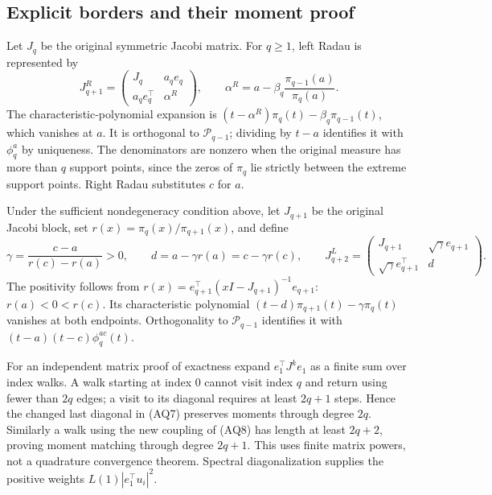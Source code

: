 \documentclass[11pt,a4paper]{article}
\theoremstyle{definition}
\begin{document}
\subsection*{Explicit borders and their moment proof}
Let $J_q$ be the original symmetric Jacobi matrix.
For $q\ge1$, left Radau is represented by
\begin{equation}
 J^R_{q+1}=\begin{pmatrix}J_q&a_qe_q\\a_qe_q^\top&\alpha^R\end{pmatrix},
 \qquad
 \alpha^R=a-\beta_q\frac{\pi_{q-1}(a)}{\pi_q(a)}.
 \tag{AQ7}
\end{equation}
The characteristic-polynomial expansion is
$(t-\alpha^R)\pi_q(t)-\beta_q\pi_{q-1}(t)$, which vanishes at $a$.
It is orthogonal to $\mathcal P_{q-1}$; dividing by $t-a$ identifies
it with $\phi_q^a$ by uniqueness.  The denominators are nonzero when
the original measure has more than $q$ support points, since the
zeros of $\pi_q$ lie strictly between the extreme support points.
Right Radau substitutes $c$ for $a$.

Under the sufficient nondegeneracy condition above, let $J_{q+1}$
be the original Jacobi block, set
$r(x)=\pi_q(x)/\pi_{q+1}(x)$, and define
\begin{equation}
 \gamma=\frac{c-a}{r(c)-r(a)}>0,
 \qquad d=a-\gamma r(a)=c-\gamma r(c),
 \qquad
 J^L_{q+2}=\begin{pmatrix}J_{q+1}&\sqrt\gamma e_{q+1}\\
                  \sqrt\gamma e_{q+1}^{\top}&d\end{pmatrix}.
 \tag{AQ8}
\end{equation}
The positivity follows from
$r(x)=e_{q+1}^{\top}(xI-J_{q+1})^{-1}e_{q+1}$:
$r(a)<0<r(c)$.  Its characteristic polynomial
$(t-d)\pi_{q+1}(t)-\gamma\pi_q(t)$ vanishes at both endpoints.
Orthogonality to $\mathcal P_{q-1}$ identifies it with
$(t-a)(t-c)\phi_q^{ac}(t)$.

For an independent matrix proof of exactness expand
$e_1^\top J^ke_1$ as a finite sum over index walks.
A walk starting at index $0$ cannot visit index $q$ and return
using fewer than $2q$ edges; a visit to its diagonal requires at
least $2q+1$ steps.  Hence the changed last diagonal in (AQ7)
preserves moments through degree $2q$.
Similarly a walk using the new coupling of (AQ8) has length at
least $2q+2$, proving moment matching through degree $2q+1$.
This uses finite matrix powers, not a quadrature convergence theorem.
Spectral diagonalization supplies the positive weights
$L(1)|e_1^\top u_i|^2$.
\end{document}
